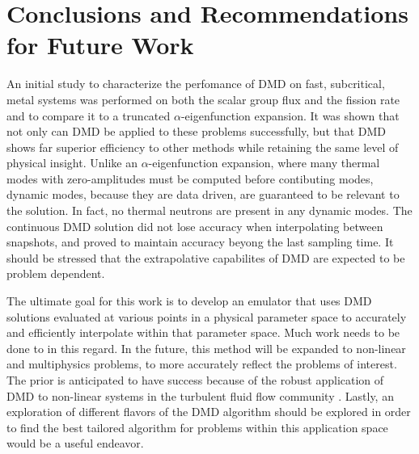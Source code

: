\documentclass{style/nseJournal}
\begin{document}
\section{Conclusions and Recommendations for Future Work}
An initial study to characterize the perfomance of DMD on fast, subcritical, metal systems was performed on both the scalar group flux and the fission rate and to compare it to a truncated $\alpha$-eigenfunction expansion.  
It was shown that not only can DMD be applied to these problems successfully, but that DMD shows far superior efficiency to other methods while retaining the same level of physical insight.  
Unlike an $\alpha$-eigenfunction expansion, where many thermal modes with zero-amplitudes must be computed before contibuting modes, dynamic modes, because they are data driven, are guaranteed to be relevant to the solution.  
In fact, no thermal neutrons are present in any dynamic modes.  
The continuous DMD solution did not lose accuracy when interpolating between snapshots, and proved to maintain accuracy beyong the last sampling time.  
It should be stressed that the extrapolative capabilites of DMD are expected to be problem dependent.  

The ultimate goal for this work is to develop an emulator that uses DMD solutions evaluated at various points in a physical parameter space to accurately and efficiently interpolate within that parameter space.  
Much work needs to be done to in this regard.  
In the future, this method will be expanded to non-linear and multiphysics problems, to more accurately reflect the problems of interest.  
The prior is anticipated to have success because of the robust application of DMD to non-linear systems in the turbulent fluid flow community \cite{kutz2016dynamic} \cite{schmid2010dynamic}.  
Lastly, an exploration of different flavors of the DMD algorithm should be explored in order to find the best tailored algorithm for problems within this application space would be a useful endeavor.  

\pagebreak

\end{document}
